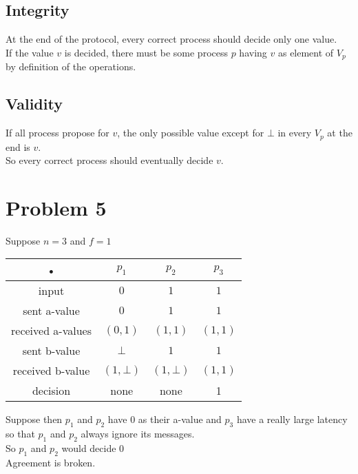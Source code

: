 \documentclass[12pt]{article}
\begin{document}
\subsection*{Integrity}
At the end of the protocol, every correct process should decide only one value.\\
If the value $v$ is decided, there must be some process $p$ having $v$ as element of $V_p$ by definition of the operations.\\

\subsection*{Validity}
If all process propose for $v$, the only possible value except for $\bot$ in every $V_p$ at the end is $v$.\\
So every correct process should eventually decide $v$.

\section*{Problem 5}
Suppose $n=3$ and $f=1$\\
\begin{tabular}{|c|c|c|c|}
\hline 
• & $p_1$ & $p_2$ & $p_3$ \\ 
\hline 
input & $0$ & $1$ & $1$ \\ 
\hline 
sent a-value & $0$ & $1$ & $1$ \\ 
\hline 
received a-values & $(0,1)$ & $(1,1)$ & $(1,1)$ \\ 
\hline 
sent b-value & $\bot$ & $1$ & $1$ \\ 
\hline 
received b-value & $(1,\bot)$ & $(1,\bot)$ & $(1,1)$ \\ 
\hline 
decision & none & none & 1 \\ 
\hline 
\end{tabular} 

Suppose then $p_1$ and $p_2$ have $0$ as their a-value and $p_3$ have a really large latency so that $p_1$ and $p_2$ always ignore its messages.\\
So $p_1$ and $p_2$ would decide $0$\\
Agreement is broken.\\
\end{document}
